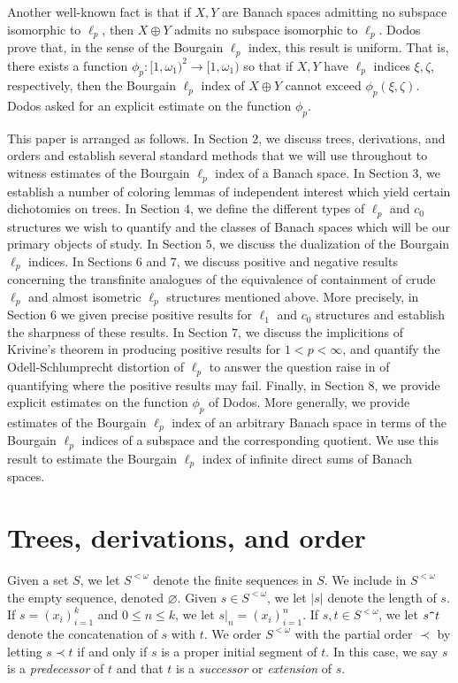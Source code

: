 \documentclass[12pt]{amsart}
\theoremstyle{definition}
\begin{document}
Another well-known fact is that if $X, Y$ are Banach spaces admitting no subspace isomorphic to $\ell_p$, then $X\oplus Y$ admits no subspace isomorphic to $\ell_p$.  Dodos \cite{D} prove that, in the sense of the Bourgain $\ell_p$ index, this result is uniform.  That is, there exists a function $\phi_p:[1, \omega_1)^2\to [1, \omega_1)$ so that if $X, Y$ have $\ell_p$ indices $\xi, \zeta$, respectively, then the Bourgain $\ell_p$ index of $X\oplus Y$ cannot exceed $\phi_p(\xi, \zeta)$.  Dodos asked for an explicit estimate on the function $\phi_p$.  

This paper is arranged as follows.  In Section $2$, we discuss trees, derivations, and orders and establish several standard methods that we will use throughout to witness estimates of the Bourgain $\ell_p$ index of a Banach space.  In Section $3$, we establish a number of coloring lemmas of independent interest which yield certain dichotomies on trees.  In Section $4$, we define the different types of $\ell_p$ and $c_0$ structures we wish to quantify and the classes of Banach spaces which will be our primary objects of study.  In Section $5$, we discuss the dualization of the Bourgain $\ell_p$ indices.  In Sections $6$ and $7$, we discuss positive and negative results concerning the transfinite analogues of the equivalence of containment of crude $\ell_p$ and almost isometric $\ell_p$ structures mentioned above.  More precisely, in Section $6$ we given precise positive results for $\ell_1$ and $c_0$ structures and establish the sharpness of these results.  In Section $7$, we discuss the implicitions of Krivine's theorem in producing positive results for $1<p<\infty$, and quantify the Odell-Schlumprecht distortion of $\ell_p$ to answer the question raise in \cite{JO} of quantifying where the positive results may fail.  Finally, in Section $8$, we provide explicit estimates on the function $\phi_p$ of Dodos.  More generally, we provide estimates of the Bourgain $\ell_p$ index of an arbitrary Banach space in terms of the Bourgain $\ell_p$ indices of a subspace and the corresponding quotient.  We use this result to estimate the Bourgain $\ell_p$ index of infinite direct sums of Banach spaces.  





\section{Trees, derivations, and order}

Given a set $S$, we let $S^{<\omega}$ denote the finite sequences in $S$.  We include in $S^{<\omega}$ the empty sequence, denoted $\varnothing$.  Given $s\in S^{<\omega}$, we let $|s|$ denote the length of $s$.  If $s=(x_i)_{i=1}^k$ and $0\leqslant n\leqslant k$, we let $s|_n=(x_i)_{i=1}^n$.  If $s,t\in S^{<\omega}$, we let $s\verb!^!t$ denote the concatenation of $s$ with $t$.   We order $S^{<\omega}$ with the partial order $\prec$ by letting $s\prec t$ if and only if $s$ is a proper initial segment of $t$.  In this case, we say $s$ is a \emph{predecessor} of $t$ and that $t$ is a \emph{successor} or \emph{extension} of $s$.  
\end{document}
